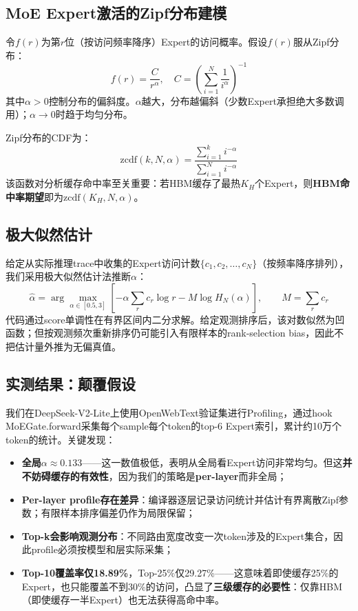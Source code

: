 \documentclass[11pt,a4paper]{article}
\begin{document}
\subsection{MoE Expert激活的Zipf分布建模}

令$f(r)$为第$r$位（按访问频率降序）Expert的访问概率。假设$f(r)$服从Zipf分布：
\begin{equation}
    f(r) = \frac{C}{r^{\alpha}}, \quad C = \left(\sum_{i=1}^{N} \frac{1}{i^{\alpha}}\right)^{-1}
\end{equation}
其中$\alpha>0$控制分布的偏斜度。$\alpha$越大，分布越偏斜（少数Expert承担绝大多数调用）；$\alpha\to 0$时趋于均匀分布。

Zipf分布的CDF为：
\begin{equation}
    \text{zcdf}(k, N, \alpha) = \frac{\sum_{i=1}^{k} i^{-\alpha}}{\sum_{i=1}^{N} i^{-\alpha}}
\end{equation}
该函数对分析缓存命中率至关重要：若HBM缓存了最热$K_H$个Expert，则\textbf{HBM命中率期望}即为$\text{zcdf}(K_H, N, \alpha)$。

\subsection{极大似然估计}

给定从实际推理trace中收集的Expert访问计数$\{c_1, c_2, \ldots, c_N\}$（按频率降序排列），我们采用极大似然估计法推断$\alpha$：
\begin{equation}
    \hat{\alpha}=\arg\max_{\alpha\in[0.5,3]}
    \left[-\alpha\sum_r c_r\log r-M\log H_N(\alpha)\right],\qquad M=\sum_r c_r
\end{equation}
代码通过score单调性在有界区间内二分求解。给定观测排序后，该对数似然为凹函数；但按观测频次重新排序仍可能引入有限样本的rank-selection bias，因此不把估计量外推为无偏真值。

\subsection{实测结果：颠覆假设}

我们在DeepSeek-V2-Lite上使用OpenWebText验证集进行Profiling，通过hook MoEGate.forward采集每个sample每个token的top-6 Expert索引，累计约10万个token的统计。关键发现：

\begin{itemize}
    \item \textbf{全局$\alpha \approx 0.133$}——这一数值极低，表明从全局看Expert访问非常均匀。但这\textbf{并不妨碍缓存的有效性}，因为我们的策略是\textbf{per-layer}而非全局；
    \item \textbf{Per-layer profile存在差异}：编译器逐层记录访问统计并估计有界离散Zipf参数；有限样本排序偏差仍作为局限保留；
    \item \textbf{Top-k会影响观测分布}：不同路由宽度改变一次token涉及的Expert集合，因此profile必须按模型和层实际采集；
    \item \textbf{Top-10覆盖率仅18.89\%}，Top-25\%仅29.27\%——这意味着即使缓存25\%的Expert，也只能覆盖不到30\%的访问，凸显了\textbf{三级缓存的必要性}：仅靠HBM（即使缓存一半Expert）也无法获得高命中率。
\end{itemize}
\end{document}

